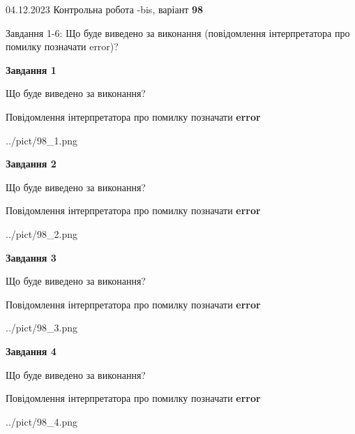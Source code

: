 \documentclass[12pt, ukrainian]{article}
\begin{document}
{{04.12.2023 Контрольна робота -bis, варіант  \No \textbf { 98 }\par}}
{

Завдання 1-6: Що буде виведено за виконання (повідомлення інтерпретатора про помилку позначати error)?


{\begin {center}\textbf{Завдання 1}\end {center}}\par
Що буде виведено за виконання? \par
Повідомлення інтерпретатора про помилку позначати \textbf{error}

\begin{center}
	{../pict/98_1.png}
\end{center}
\newpage

{\begin {center}\textbf{Завдання 2}\end {center}}\par
Що буде виведено за виконання? \par
Повідомлення інтерпретатора про помилку позначати \textbf{error}

\begin{center}
	{../pict/98_2.png}
\end{center}
\newpage

{\begin {center}\textbf{Завдання 3}\end {center}}\par
Що буде виведено за виконання? \par
Повідомлення інтерпретатора про помилку позначати \textbf{error}

\begin{center}
	{../pict/98_3.png}
\end{center}
\newpage

{\begin {center}\textbf{Завдання 4}\end {center}}\par
Що буде виведено за виконання? \par
Повідомлення інтерпретатора про помилку позначати \textbf{error}

\begin{center}
	{../pict/98_4.png}
\end{center}
\newpage

}
\end{document}
